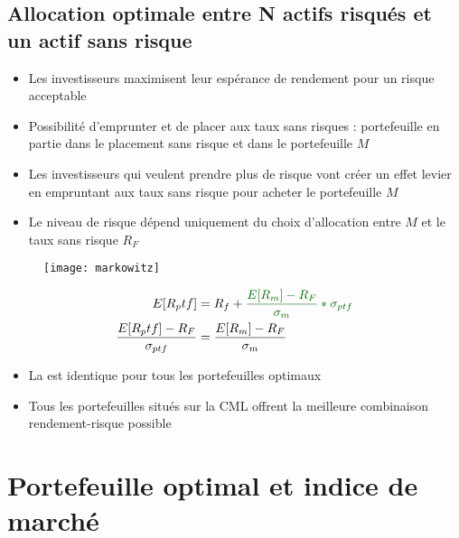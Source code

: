 \subsection{Allocation optimale entre N actifs risqués et un actif sans risque}

\begin{itemize}
    \item Les investisseurs maximisent leur espérance de rendement pour un risque acceptable
    \item Possibilité d'emprunter et de placer aux taux sans risques : portefeuille en partie dans le placement sans risque et dans le portefeuille $M$
    \item Les investisseurs qui veulent prendre plus de risque vont créer un effet levier en empruntant aux taux sans risque pour acheter le portefeuille $M$
    \item Le niveau de risque dépend uniquement du choix d'allocation entre $M$ et le taux sans risque $R_F$
\end{itemize}

\begin{figure}[H]
    \centering
    \texttt{[image: markowitz]}
\end{figure}
\begin{align*}
    E[R_ptf] &= R_f + \textgreen{\frac{E[R_m] - R_F}{\sigma_m} * \sigma_{ptf}}\\
    \frac{E[R_ptf] - R_F}{\sigma_{ptf}} &= \frac{E[R_m] - R_F}{\sigma_m}
\end{align*}
\begin{itemize}
    \item La  est identique pour tous les portefeuilles optimaux
    \item Tous les portefeuilles situés sur la CML offrent la meilleure combinaison rendement-risque possible
\end{itemize}

\section{Portefeuille optimal et indice de marché}

